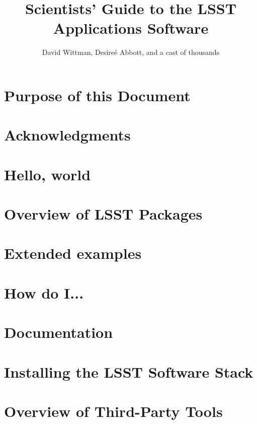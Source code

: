 \documentclass{book}
\title{Scientists' Guide to the LSST Applications Software}
\author{David Wittman, Desire\'{e} Abbott, and a cast of thousands}
\begin{document}
\maketitle


\chapter*{Purpose of this Document\label{chap-purpose}}


\chapter*{Acknowledgments\label{chap-acknowledgements}}



\chapter{Hello, world\label{chap-hello}}


\chapter{Overview of LSST Packages\label{chap-overview}}



\chapter{Extended examples\label{chap-examples}}


\chapter{How do I...\label{chap-howto}}


\chapter{Documentation\label{chap-doc}}


%
% 
%


\appendix

\chapter{Installing the LSST Software Stack\label{appendix-stackinstall}}


\chapter{Overview of Third-Party Tools\label{appendix-thirdparty}}

\end{document}
